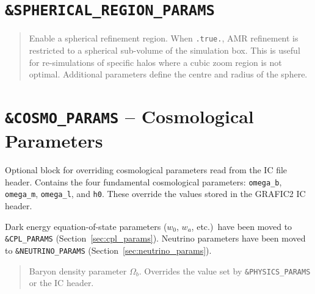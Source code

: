 \section{\texttt{\&SPHERICAL\_REGION\_PARAMS}}
\label{sec:spherical_region_params}

\label{param:spherical_region}

\begin{quote}
Enable a spherical refinement region.  When \texttt{.true.}, AMR
refinement is restricted to a spherical sub-volume of the simulation
box.  This is useful for re-simulations of specific halos where a
cubic zoom region is not optimal.  Additional parameters define the
centre and radius of the sphere.
\end{quote}


\section{\texttt{\&COSMO\_PARAMS} -- Cosmological Parameters}
\label{sec:cosmo_params}

Optional block for overriding cosmological parameters read from the
IC file header.  Contains the four fundamental cosmological parameters:
\texttt{omega\_b}, \texttt{omega\_m}, \texttt{omega\_l}, and
\texttt{h0}.  These override the values stored in the GRAFIC2 IC
header.

Dark energy equation-of-state parameters ($w_0$, $w_a$, etc.)\ have
been moved to \texttt{\&CPL\_PARAMS}
(Section~\ref{sec:cpl_params}).  Neutrino parameters have been moved
to \texttt{\&NEUTRINO\_PARAMS} (Section~\ref{sec:neutrino_params}).

\label{param:cosmo_omega_b}

\begin{quote}
Baryon density parameter $\Omega_b$.  Overrides the value set by
\texttt{\&PHYSICS\_PARAMS} or the IC header.
\end{quote}

\label{param:cosmo_omega_m}

